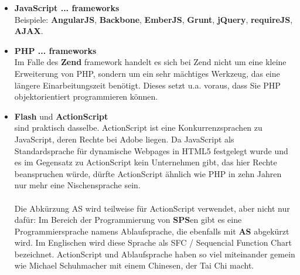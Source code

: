 \begin{itemize}
	\item \textbf{JavaScript ... frameworks}\\
	Beispiele: \textbf{AngularJS}, \textbf{Backbone}, \textbf{EmberJS}, \textbf{Grunt}, \textbf{jQuery}, \textbf{requireJS}, \textbf{AJAX}. 
	
	\item \textbf{PHP ... frameworks}\\
	Im Falle des \textbf{Zend} framework handelt es sich bei Zend nicht um eine kleine Erweiterung von PHP, sondern um ein sehr mächtiges Werkzeug, das eine längere Einarbeitungszeit benötigt. Dieses setzt u.a. voraus, dass Sie PHP objektorientiert programmieren können. 
	
	\item \textbf{Flash} und \textbf{ActionScript}\\
	sind praktisch dasselbe. ActionScript ist eine Konkurrenzsprachen zu JavaScript, deren Rechte bei Adobe liegen. Da JavaScript als Standardsprache für dynamische Webpages in HTML5 festgelegt wurde und es im Gegensatz zu ActionScript kein Unternehmen gibt, das hier Rechte beanspruchen würde, dürfte ActionScript ähnlich wie PHP in zehn Jahren nur mehr eine Nischensprache sein.\\
	\\
	Die Abkürzung AS wird teilweise für ActionScript verwendet, aber nicht nur dafür: Im Bereich der Programmierung von \textbf{SPS}en gibt es eine Programmiersprache namens Ablaufsprache, die ebenfalls mit \textbf{AS} abgekürzt wird. Im Englischen wird diese Sprache als SFC / Sequencial Function Chart bezeichnet. ActionScript und Ablaufsprache haben so viel miteinander gemein wie Michael Schuhmacher mit einem Chinesen, der Tai Chi macht.\\
	

\end{itemize}
